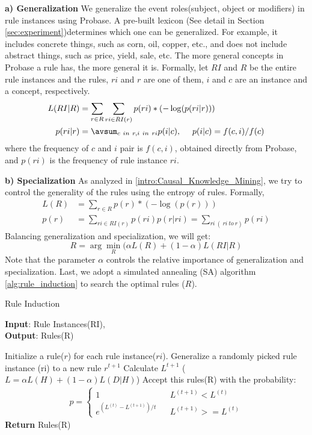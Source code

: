 \textbf{a) Generalization}
We generalize the event roles(subject, object or modifiers) in rule instances using Probase. A pre-built lexicon (See detail in Section \ref{sec:experiment})determines which one can be generalized. For example, it includes concrete things, such as corn, oil, copper, etc., and does not include abstract things, such as price, yield, sale, etc.
The more general concepts in Probase a rule has, the more general it is. Formally, let $RI$ and $R$ be the entire rule instances and the rules, $ri$ and $r$ are one of them, $i$ and $c$ are an instance and a concept, respectively.
\begin{equation*}
\begin{split}
L(RI|R)&=\sum_{r \in R}\sum_{ri \in RI(r)}{p(ri)*(-\log(p(ri|r)))} \\
p(ri|r)&=\avsum_{c\ in\ r, i\ in\ ri}{p(i|c)}, \ \ \ \  p(i|c)=f(c,i)/f(c)
\end{split}
\label{equ:mdl_1}
\end{equation*}
where the frequency of $c$ and $i$ pair is $f(c,i)$, obtained directly from Probase, and $p(ri)$ is the frequency of rule instance $ri$.

\textbf{b) Specialization}
As analyzed in \ref{intro:Causal_Knowledge_Mining}, we try to control the generality of the rules using the entropy of rules. Formally,
\begin{equation*}
\begin{split}
L(R)&=\sum_{r \in R}{p(r)*(-\log(p(r)))}\\
p(r)&=\sum_{ri \in RI(r)}{p(ri)p(r|ri)}=\sum_{ri \ (\ ri\ to\ r)}p(ri)
\end{split}
\label{equ:mdl_2}
\end{equation*}
Balancing generalization and specialization, we will get:
$$R=\arg\min_{R}(\alpha L(R)+(1-\alpha)L(RI|R)\label{eq:objective_function}$$
Note that the parameter $\alpha$ controls the relative importance of generalization and specialization.  
Last, we adopt a simulated annealing (SA) algorithm \ref{alg:rule_induction} to search the optimal rules ($R$). 
\begin{algorithm}[htb]
\caption{Rule Induction\label{alg:rule_induction}} 
\textbf{Input}: Rule Instances(RI), \zhpro \\
\textbf{Output}: Rules(R)
\begin{algorithmic}[1]
	\STATE Initialize a rule($r$) for each rule instance($ri$).
	\STATE	Generalize a randomly picked rule instance (ri) to a new rule $r^{t+1}$
	\STATE	Calculate $L^{t+1}$ ($L=\alpha L(H)+(1-\alpha)L(D|H)$)
	\STATE	Accept this rules(R) with the probability:
	\STATE	\begin{equation*}\begin{split}p=\left\{\begin{array}{rcl}1 & & {L^{(t+1)} < L^{(t)}}\\e^{(L^{(t)}-L^{(t+1)})/t}& &{L^{(t+1)}>= L^{(t)}}\end{array} \right.	\end{split}\end{equation*}
	\ENDWHILE
	\STATE \textbf{Return} Rules(R) 
\end{algorithmic}
\end{algorithm}	



